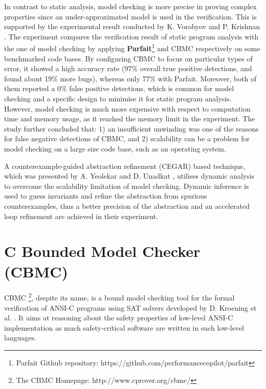 In contrast to static analysis, model checking is more precise in proving complex properties since an under-approximated model is used in the verification. This is supported by the experimental result conducted by K. Vorobyov and P. Krishnan \cite{vorobyov2010comparing}. The experiment compares the verification result of static program analysis with the one of model checking by applying \textbf{Parfait}\footnote{Parfait Github repository: https://github.com/performancecopilot/parfait} and CBMC respectively on some benchmarked code bases. By configuring CBMC to focus on particular types of error, it showed a high accuracy rate (97\% overall true positive detections, and found about 19\% more bugs), whereas only 77\% with Parfait. Moreover, both of them reported a 0\% false positive detections, which is common for model checking and a specific design to minimise it for static program analysis. However, model checking is much more expensive with respect to computation time and memory usage, as it reached the memory limit in the experiment. The study further concluded that: 1) an insufficient unwinding was one of the reasons for false negative detections of CBMC, and 2) scalability can be a problem for model checking on a large size code base, such as an operating system.

A counterexample-guided abstraction refinement (CEGAR) based technique, which was presented by A. Yeolekar and D. Unadkat \cite{Yeolekar2013}, utilises dynamic analysis to overcome the scalability limitation of model checking. Dynamic inference is used to guess invariants and refine the abstraction from spurious counterexamples, thus a better precision of the abstraction and an accelerated loop refinement are achieved in their experiment. 




\section{C Bounded Model Checker (CBMC)} \label{sec:cbmc}
CBMC \footnote{The CBMC Homepage: http://www.cprover.org/cbmc/}, despite its name, is a bound model checking tool for the formal verification of ANSI-C programs using SAT solvers developed by D. Kroening et al. \cite{ckl2004}. It aims at reasoning about the safety properties of low-level ANSI-C implementation as much safety-critical software are written in such low-level languages. 

